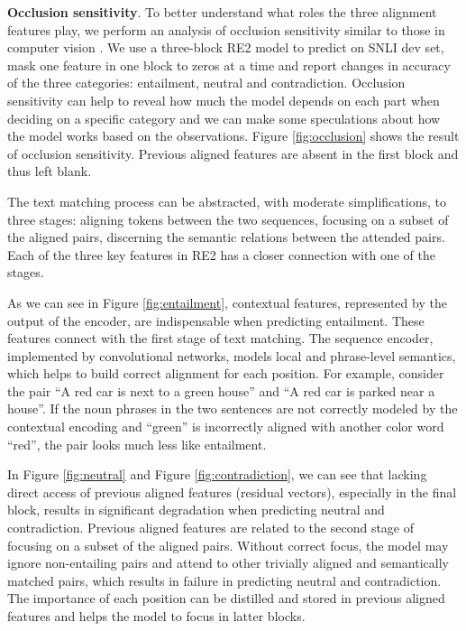 \documentclass[11pt,a4paper]{article}
\begin{document}
{\bf Occlusion sensitivity}. To better understand what roles the three alignment features play, we perform an analysis of occlusion sensitivity similar to those in computer vision \cite{zeiler2014visualizing}. We use a three-block RE2 model to predict on SNLI dev set, mask one feature in one block to zeros at a time and report changes in accuracy of the three categories: entailment, neutral and contradiction. Occlusion sensitivity can help to reveal how much the model depends on each part when deciding on a specific category and we can make some speculations about how the model works based on the observations. Figure \ref{fig:occlusion} shows the result of occlusion sensitivity. Previous aligned features are absent in the first block and thus left blank.

The text matching process can be abstracted, with moderate simplifications, to three stages: aligning tokens between the two sequences, focusing on a subset of the aligned pairs, discerning the semantic relations between the attended pairs. Each of the three key features in RE2 has a closer connection with one of the stages. 

As we can see in Figure \ref{fig:entailment}, contextual features, represented by the output of the encoder, are indispensable when predicting entailment. These features connect with the first stage of text matching. The sequence encoder, implemented by convolutional networks, models local and phrase-level semantics, which helps to build correct alignment for each position. For example, consider the pair ``A red car is next to a green house'' and ``A red car is parked near a house''. If the noun phrases in the two sentences are not correctly modeled by the contextual encoding and ``green'' is incorrectly aligned with another color word ``red'', the pair looks much less like entailment. 

In Figure \ref{fig:neutral} and Figure \ref{fig:contradiction}, we can see that lacking direct access of previous aligned features (residual vectors), especially in the final block, results in significant degradation when predicting neutral and contradiction. Previous aligned features are related to the second stage of focusing on a subset of the aligned pairs. Without correct focus, the model may ignore non-entailing pairs and attend to other trivially aligned and semantically matched pairs, which results in failure in predicting neutral and contradiction. The importance of each position can be distilled and stored in previous aligned features and helps the model to focus in latter blocks.
\end{document}
